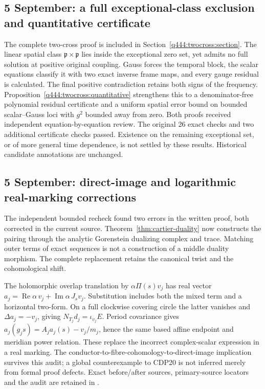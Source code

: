 \subsection*{5 September: a full exceptional-class exclusion and quantitative certificate}
The complete two-cross proof is included in
Section~\ref{q444:twocross:section}. The linear spatial class
$\mathfrak p\times\mathfrak p$ lies inside the exceptional zero set,
yet admits no full solution at positive original coupling.
Gauss forces the temporal block, the scalar equations classify it with
two exact inverse frame maps, and every gauge residual is calculated.
The final positive contradiction retains both signs of the frequency.
Proposition~\ref{q444:twocross:quantitative} strengthens this to a
denominator-free polynomial residual certificate and a uniform spatial
error bound on bounded scalar--Gauss loci with $g^2$ bounded away from zero.
Both proofs received independent equation-by-equation review. The original
26 exact checks and two additional certificate checks passed. Existence
on the remaining exceptional set, or of more general time dependence,
is not settled by these results. Historical candidate annotations are unchanged.

\subsection*{5 September: direct-image and logarithmic real-marking corrections}
The independent bounded recheck found two errors in the written proof,
both corrected in the current source. Theorem~\ref{thm:cartier-duality}
now constructs the pairing through the analytic Gorenstein dualizing
complex and trace. Matching outer terms of exact sequences is not a
construction of a middle duality morphism. The complete replacement
retains the canonical twist and the cohomological shift.

The holomorphic overlap translation by $\alpha\Pi(s)v_j$ has real
vector $a_j=\operatorname{Re}\alpha\,v_j+\operatorname{Im}\alpha\,J_sv_j$.
Substitution includes both the mixed term and a horizontal two-form.
On a full clockwise covering circle the latter vanishes and
$\Delta a_j=-v_j$, giving $N_{T_j}d_j=\iota_{v_j}E$.
Period covariance gives $a_j(g_js)=A_ja_j(s)-v_j/m_j$, hence the
same based affine endpoint and meridian power relation.
These replace the incorrect complex-scalar expression in a real marking.
The conductor-to-fibre-cohomology-to-direct-image implication survives
this audit; a global counterexample to CDP20 is not inferred merely
from formal proof defects. Exact before/after sources, primary-source
locators and the audit are retained in
.

